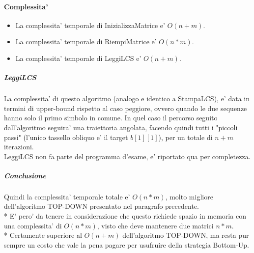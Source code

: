 \pagebreak

\paragraph{Complessita'}

\begin{itemize}
    \item La complessita' temporale di InizializzaMatrice e' $O(n+m)$.
    \item La complessita' temporale di RiempiMatrice e' $O(n*m)$.
    \item La complessita' temporale di LeggiLCS e' $O(n+m)$.
\end{itemize}

\subparagraph{LeggiLCS}
La complessita' di questo algoritmo (analogo e identico a StampaLCS), e' data in termini di upper-bound rispetto al caso peggiore, ovvero quando le due sequenze hanno solo il primo simbolo in comune. In quel caso il percorso seguito dall'algoritmo seguira' una traiettoria angolata, facendo quindi tutti i "piccoli passi" (l'unico tassello obliquo e' il target $b[1][1]$), per un totale di $n+m$ iterazioni. \\
LeggiLCS non fa parte del programma d'esame, e' riportato qua per completezza.

\subparagraph{Conclusione}
Quindi la complessita' temporale totale e' $O(n*m)$, molto migliore dell'algoritmo TOP-DOWN presentato nel paragrafo precedente. \\ *
E' pero' da tenere in considerazione che questo richiede spazio in memoria con una complessita' di $O(n * m)$, visto che deve mantenere due matrici $n*m$. \\*
Certamente superiore al $O(n + m)$ dell'algoritmo TOP-DOWN, ma resta pur sempre un costo che vale la pena pagare per usufruire della strategia Bottom-Up.
